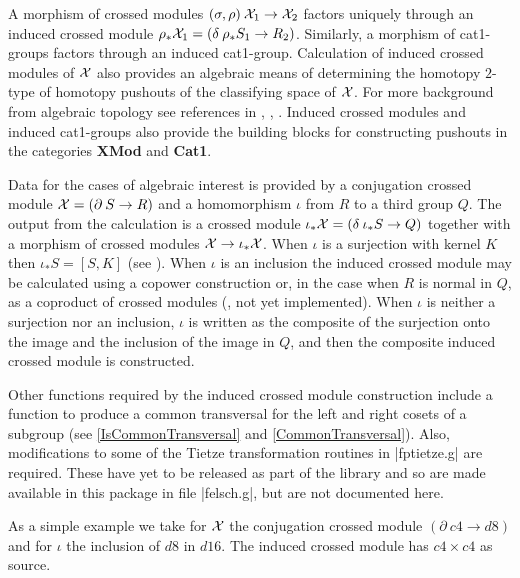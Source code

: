 {\newpage


%

A morphism of crossed modules
$(\sigma, \rho) \: {\cal X}_1 \to {\cal X}_2$
factors uniquely through an induced crossed module
$\rho_{\ast} {\cal X}_1 = (\delta \: \rho_{\ast} S_1 \to R_2)$.
Similarly, a morphism of cat1-groups factors through an induced cat1-group.
Calculation of induced crossed modules of ${\cal X}$ also
provides an algebraic means of determining the homotopy $2$-type
of homotopy pushouts of the classifying space of ${\cal X}$.
For more background from algebraic topology see references in
\cite{BH1}, \cite{BW1}, \cite{BW2}.
Induced crossed modules and induced cat1-groups also provide the
building blocks for constructing pushouts in the categories
\textbf{XMod} and \textbf{Cat1}.

Data for the cases of algebraic interest is provided by a conjugation
crossed module  ${\cal X} = (\partial \: S \to R)$
and a homomorphism  $\iota$  from  $R$  to a third group  $Q$.
The output from the calculation is a crossed module
$\iota_{\ast}{\cal X} = (\delta \: \iota_{\ast}S \to Q)$
together with a morphism of crossed modules
${\cal X} \to \iota_{\ast}{\cal X}$.
When $\iota$ is a surjection with kernel $K$ then
$\iota_{\ast} S = [S,K]$ (see \cite{BH1}).
When $\iota$ is an inclusion the induced crossed module may be
calculated using a copower construction \cite{BW1} or,
in the case when $R$ is normal in $Q$, as a coproduct of crossed modules 
(\cite{BW2}, not yet implemented).
When $\iota$ is neither a surjection nor an inclusion, $\iota$
is written as the composite of the surjection onto the image
and the inclusion of the image in $Q$, and then the composite induced
crossed module is constructed.

Other functions required by the induced crossed module construction
include a function to produce a common transversal for the left and
right cosets of a subgroup 
(see \ref{IsCommonTransversal} and \ref{CommonTransversal}).
Also, modifications to some of the Tietze transformation routines 
in |fptietze.g| are required.
These have yet to be released as part of the {\GAP} library
and so are made available in this package in file |felsch.g|,
but are not documented here.

As a simple example we take for ${\cal X}$ the conjugation crossed
module $(\partial \: c4 \to d8)$ and for $\iota$ the inclusion of
$d8$ in $d16$.  The induced crossed module has $c4 \times c4$
as source.

}
